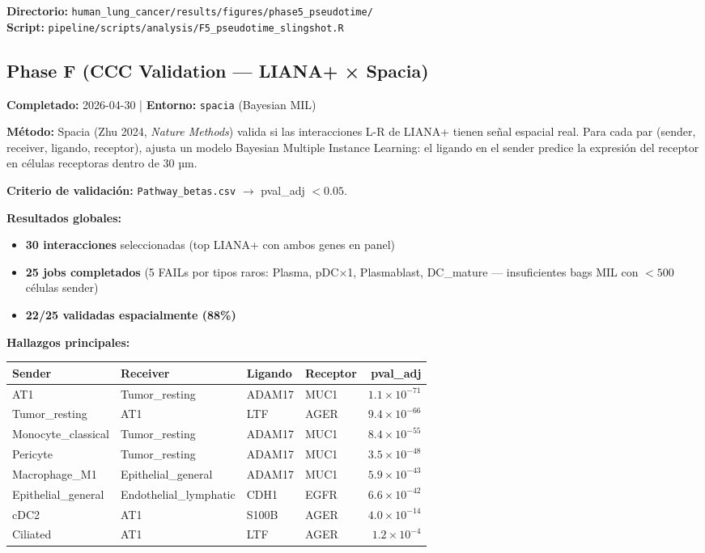 \documentclass[11pt,a4paper]{article}
\begin{document}
\textbf{Directorio:} \texttt{\small human\_lung\_cancer/results/figures/phase5\_pseudotime/} \\
\textbf{Script:} \texttt{pipeline/scripts/analysis/F5\_pseudotime\_slingshot.R}

\subsection{Phase F (CCC Validation --- LIANA+ × Spacia)}
\textbf{Completado:} 2026-04-30 | \textbf{Entorno:} \texttt{spacia} (Bayesian MIL)

\textbf{Método:} Spacia (Zhu 2024, \textit{Nature Methods}) valida si las interacciones L-R de LIANA+ tienen señal espacial real. Para cada par (sender, receiver, ligando, receptor), ajusta un modelo Bayesian Multiple Instance Learning: el ligando en el sender predice la expresión del receptor en células receptoras dentro de 30 µm.

\textbf{Criterio de validación:} \texttt{Pathway\_betas.csv} $\to$ pval\_adj $< 0.05$.

\textbf{Resultados globales:}
\begin{itemize}[leftmargin=*]
\item \textbf{30 interacciones} seleccionadas (top LIANA+ con ambos genes en panel)
\item \textbf{25 jobs completados} (5 FAILs por tipos raros: Plasma, pDC$\times$1, Plasmablast, DC\_mature --- insuficientes bags MIL con $<500$ células sender)
\item \textbf{22/25 validadas espacialmente (88\%)}
\end{itemize}

\textbf{Hallazgos principales:}

\begin{longtable}{|p{3.5cm}|p{2.2cm}|p{2.5cm}|p{2.5cm}|r|}
\hline
\rowcolor{lightgray}\textbf{Sender} & \textbf{Receiver} & \textbf{Ligando} & \textbf{Receptor} & \textbf{pval\_adj} \\
\hline
AT1 & Tumor\_resting & ADAM17 & MUC1 & $1.1\times10^{-71}$ \\
\hline
Tumor\_resting & AT1 & LTF & AGER & $9.4\times10^{-66}$ \\
\hline
Monocyte\_classical & Tumor\_resting & ADAM17 & MUC1 & $8.4\times10^{-55}$ \\
\hline
Pericyte & Tumor\_resting & ADAM17 & MUC1 & $3.5\times10^{-48}$ \\
\hline
Macrophage\_M1 & Epithelial\_general & ADAM17 & MUC1 & $5.9\times10^{-43}$ \\
\hline
Epithelial\_general & Endothelial\_lymphatic & CDH1 & EGFR & $6.6\times10^{-42}$ \\
\hline
cDC2 & AT1 & S100B & AGER & $4.0\times10^{-14}$ \\
\hline
Ciliated & AT1 & LTF & AGER & $1.2\times10^{-4}$ \\
\hline
\end{longtable}
\end{document}
